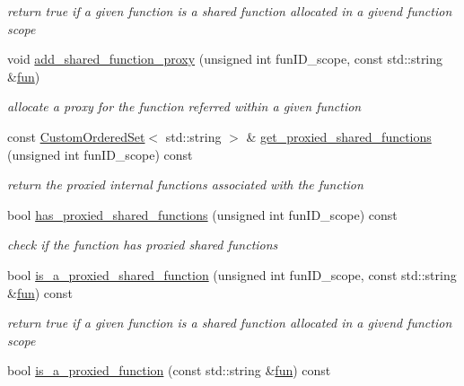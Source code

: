 \begin{DoxyCompactItemize}
\begin{DoxyCompactList}\small\item\em return true if a given function is a shared function allocated in a givend function scope \end{DoxyCompactList}\item 
void \hyperlink{classfunctions_ac619c1c655baa02b54828555551f0ddf}{add\+\_\+shared\+\_\+function\+\_\+proxy} (unsigned int fun\+I\+D\+\_\+scope, const std\+::string \&\hyperlink{tutorial__pact__2019_2Introduction_2fourth_2module_8c_a0a2db8044a7b4ea68582e434d4f4692c}{fun})
\begin{DoxyCompactList}\small\item\em allocate a proxy for the function referred within a given function \end{DoxyCompactList}\item 
const \hyperlink{classCustomOrderedSet}{Custom\+Ordered\+Set}$<$ std\+::string $>$ \& \hyperlink{classfunctions_a0dc27d773ab21876d91082e54b100780}{get\+\_\+proxied\+\_\+shared\+\_\+functions} (unsigned int fun\+I\+D\+\_\+scope) const
\begin{DoxyCompactList}\small\item\em return the proxied internal functions associated with the function \end{DoxyCompactList}\item 
bool \hyperlink{classfunctions_a97f9fd743ecd37a8538880ecd21e09c7}{has\+\_\+proxied\+\_\+shared\+\_\+functions} (unsigned int fun\+I\+D\+\_\+scope) const
\begin{DoxyCompactList}\small\item\em check if the function has proxied shared functions \end{DoxyCompactList}\item 
bool \hyperlink{classfunctions_ab0dc3920fb572cb4fb7da178bf285619}{is\+\_\+a\+\_\+proxied\+\_\+shared\+\_\+function} (unsigned int fun\+I\+D\+\_\+scope, const std\+::string \&\hyperlink{tutorial__pact__2019_2Introduction_2fourth_2module_8c_a0a2db8044a7b4ea68582e434d4f4692c}{fun}) const
\begin{DoxyCompactList}\small\item\em return true if a given function is a shared function allocated in a givend function scope \end{DoxyCompactList}\item 
bool \hyperlink{classfunctions_a01a8c5e566f31f6b3a4f36c9bc9e979b}{is\+\_\+a\+\_\+proxied\+\_\+function} (const std\+::string \&\hyperlink{tutorial__pact__2019_2Introduction_2fourth_2module_8c_a0a2db8044a7b4ea68582e434d4f4692c}{fun}) const

\end{DoxyCompactItemize}
